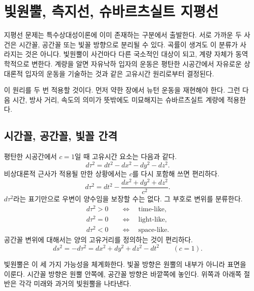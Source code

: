 \chapter{빛원뿔, 측지선, 슈바르츠실트 지평선}

지평선 문제는 특수상대성이론에 이미 존재하는 구분에서 출발한다. 서로 가까운 두 사건은 시간꼴, 공간꼴 또는 빛꼴 방향으로 분리될 수 있다. 곡률이 생겨도 이 분류가 사라지는 것은 아니다. 빛원뿔이 사건마다 다른 국소적인 대상이 되고, 계량 자체가 동역학적으로 변한다. 계량을 알면 자유낙하 입자의 운동은 평탄한 시공간에서 자유로운 상대론적 입자의 운동을 기술하는 것과 같은 고유시간 원리로부터 결정된다.

이 원리를 두 번 적용할 것이다. 먼저 약한 장에서 뉴턴 운동을 재현해야 한다. 그런 다음 시간, 방사 거리, 속도의 의미가 뜻밖에도 미묘해지는 슈바르츠실트 계량에 적용한다.

\section{시간꼴, 공간꼴, 빛꼴 간격}

평탄한 시공간에서 \(c=1\)일 때 고유시간 요소는 다음과 같다.
\begin{equation}
d\tau^2=dt^2-dx^2-dy^2-dz^2.
\label{eq:l5-minkowski-proper-time}
\end{equation}
비상대론적 근사가 적용될 만한 상황에서는 \(c\)를 다시 포함해 쓰면 편리하다.
\begin{equation}
d\tau^2
=dt^2-\frac{dx^2+dy^2+dz^2}{c^2}.
\label{eq:l5-minkowski-c}
\end{equation}
\(d\tau^2\)라는 표기만으로 우변이 양수임을 보장할 수는 없다. 그 부호로 변위를 분류한다.
\begin{align}
d\tau^2>0
&\quad\Longleftrightarrow\quad \text{time-like},\\
d\tau^2=0
&\quad\Longleftrightarrow\quad \text{light-like},\\
d\tau^2<0
&\quad\Longleftrightarrow\quad \text{space-like}.
\end{align}
공간꼴 변위에 대해서는 양의 고유거리를 정의하는 것이 편리하다.
\begin{equation}
ds^2=-d\tau^2
=dx^2+dy^2+dz^2-dt^2
\qquad(c=1).
\label{eq:l5-proper-distance}
\end{equation}

빛원뿔은 이 세 가지 가능성을 체계화한다. 빛꼴 방향은 원뿔의 내부가 아니라 표면을 이룬다. 시간꼴 방향은 원뿔 안쪽에, 공간꼴 방향은 바깥쪽에 놓인다. 위쪽과 아래쪽 절반은 각각 미래와 과거의 빛원뿔을 나타낸다.

